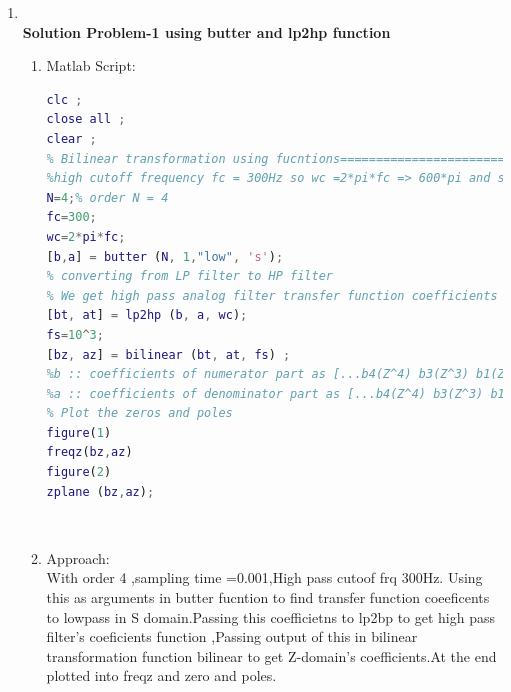 \documentclass{article}
\begin{document}
\begin{enumerate}
\item \large  \\
\textbf{Solution Problem-1 using butter and lp2hp function}
\begin{enumerate}

	\item Matlab Script: 
	\begin{lstlisting}[language=Matlab]
clc ;
close all ;
clear ;
% Bilinear transformation using fucntions============================================
%high cutoff frequency fc = 300Hz so wc =2*pi*fc => 600*pi and sampling f=1000
N=4;% order N = 4
fc=300;
wc=2*pi*fc;
[b,a] = butter (N, 1,"low", 's');
% converting from LP filter to HP filter
% We get high pass analog filter transfer function coefficients bt and at
[bt, at] = lp2hp (b, a, wc);
fs=10^3;
[bz, az] = bilinear (bt, at, fs) ;
%b :: coefficients of numerator part as [...b4(Z^4) b3(Z^3) b1(Z^2) b1(Z^1) b0(Z^0) b(-1)(Z^-1) b(-2)(Z^-2) b(-3)(Z^-3) ..]
%a :: coefficients of denominator part as [...b4(Z^4) b3(Z^3) b1(Z^2) b1(Z^1) b0(Z^0) b(-1)(Z^-1) b(-2)(Z^-2) b(-3)(Z^-3) ..]
% Plot the zeros and poles
figure(1)
freqz(bz,az)
figure(2)
zplane (bz,az);
\end{lstlisting}
\\	
    \item Approach:\\
  With order 4 ,sampling time =0.001,High pass cutoof frq 300Hz. Using this as arguments in butter fucntion to find transfer function coeeficents to lowpass in S domain.Passing this coefficietns to lp2bp to get high pass filter's coeficients function ,Passing output of this in bilinear transformation function bilinear to get Z-domain's coefficients.At the end plotted into freqz and zero and poles.
   \\


\end{enumerate}
\end{enumerate}
\end{document}
